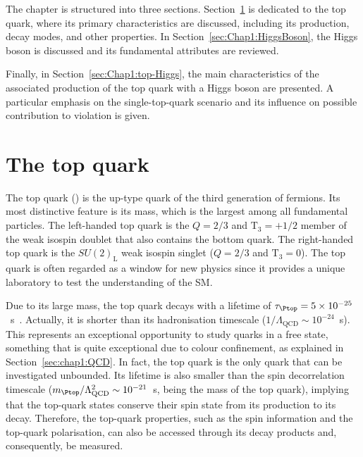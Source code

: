 The chapter is structured into three sections. Section~\ref{sec:Chap1:Top} is dedicated to
the top quark, where its primary characteristics are discussed, including its production, decay 
modes, and other properties.
In Section~\ref{sec:Chap1:HiggsBoson}, the Higgs boson is discussed and
its fundamental attributes are reviewed.

Finally, in Section~\ref{sec:Chap1:top-Higgs}, the main characteristics of the associated production 
of the top quark with a Higgs boson are presented.  A particular emphasis on the single-top-quark scenario and
its influence on possible contribution to \CP violation is given.




\section{The top quark}
\label{sec:Chap1:Top}
The top
quark (\Ptop) is the up-type quark of the third generation of fermions.
Its most distinctive feature is its mass, which is the largest among all %
fundamental particles. 
The left-handed top quark is the $Q=2/3$ and $\text{T}_{3} = +1/2$ member of the weak isospin
doublet that also contains the bottom quark. The right-handed top quark is the $SU(2)_\text{L}$
weak isospin singlet ($Q=2/3$ and $\text{T}_{3} = 0$). %
The top quark is often regarded  as a window for new physics
since it provides a unique laboratory to test the understanding of the SM. 

Due to its large mass, the top quark decays with a lifetime of $\tau_{\Ptop} = 5 \times 10^{-25}$~s~\cite{Taylor:1998uk}. 
Actually, it is shorter than its hadronisation timescale ($1/\Lambda_{\text{QCD}} \sim 10^{-24}$~s).
This represents an exceptional opportunity to study quarks in a free state, something that is quite exceptional
due to colour confinement, as explained  in Section~\ref{sec:chap1:QCD}. 
In fact, the top quark is the only quark that can be investigated unbounded. 
Its lifetime is also smaller than the spin decorrelation timescale ($\mtop /\Lambda^{2}_{\text{QCD}} \sim 10^{-21}$~s\cite{Mahlon:2010gw}, being \mtop the mass of the top quark),
implying that the top-quark states conserve their spin state from its production to its decay.
Therefore, the top-quark properties, such as the spin information and the top-quark
polarisation, can also be accessed through its decay 
products and, consequently, be measured. %


